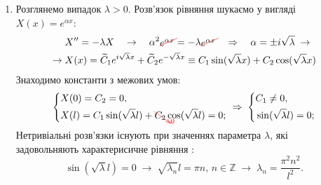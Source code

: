 \documentclass[a4paper, 14pt]{extreport}
\begin{document}
\begin{enumerate}
\begin{enumerate}
        \item Розглянемо випадок $\lambda > 0$. Розв'язок рівняння шукаємо у вигляді $X(x) = e^{\alpha x}$: 
        \begin{equation*}
            \begin{aligned}
                &X^{\prime\prime} = -\lambda X
                \quad\to\quad
                \alpha^2 \textcolor{red}{\begin{xy}*{\textcolor{black}{e^{\alpha x}}};p+LD;+RU**h@{}+/\jot/**h@{-}\end{xy}} = -\lambda \textcolor{red}{\begin{xy}*{\textcolor{black}{e^{\alpha x}}};p+LD;+RU**h@{}+/\jot/**h@{-}\end{xy}}
                \quad\Rightarrow\quad
                \alpha = \pm i\sqrt{\lambda}
                \;\to\\
                \to\;
                &X(x) = \widetilde{C}_1 e^{i\sqrt{\lambda}x} + \widetilde{C}_2 e^{-\sqrt{\lambda}x} \equiv C_1 \sin(\sqrt{\lambda}x) + C_2 \cos({\sqrt{\lambda}x})
            \end{aligned}
        \end{equation*}
        Знаходимо константи з межових умов:
        \begin{equation*}
            \begin{aligned}
                \left\{ \begin{aligned}
                    &X(0) = C_2 = 0, \\ 
                    &X(l) = C_1 \sin(\sqrt{\lambda}l) + \textcolor{red}{\begin{xy}*{\textcolor{black}{C_2}};p+LU;+RD**h@{}+//**h@{-}*h@{>}*h!LD{\scriptstyle 0}\end{xy}} \cos({\sqrt{\lambda}l}) = 0;
                \end{aligned} \right.
                \;\Rightarrow\;
                \left\{ \begin{aligned}
                    &C_1 \neq 0, \\ 
                    &\sin(\sqrt{\lambda}l) = 0;
                \end{aligned} \right.
            \end{aligned}
        \end{equation*}
        Нетривіальні розв'язки існують при значеннях параметра $\lambda$, які задовольняють характерисичне рівняння :
        \begin{equation*}
            \sin(\sqrt{\lambda}l) = 0
            \;\to\;
            \sqrt{\lambda_n}l = \pi n, \, n \in \mathbb{Z}
            \;\to\;
            \lambda_n = \frac{\pi^2 n^2}{l^2}.
        \end{equation*}
    \end{enumerate}
\end{enumerate} 
\end{document}
